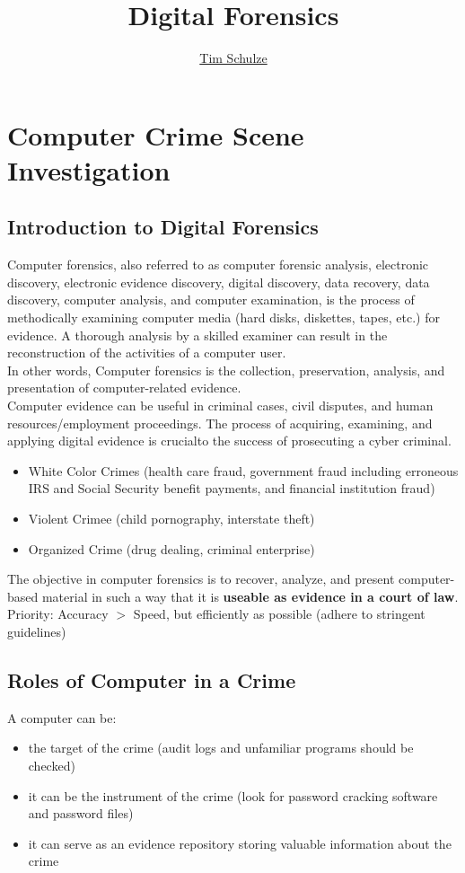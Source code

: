 \documentclass{scrreprt}
\title{\textbf{Digital Forensics}}
\author{\href{https://www.instagram.com/timds21/}{\color{black}Tim Schulze}}
\date{}
\begin{document}
\maketitle
\pagebreak
\renewcommand{\contentsname}{Inhaltsverzeichnis}
\setcounter{tocdepth}{1}
\tableofcontents
{}
\pagebreak
{}
\chapter{Computer Crime Scene Investigation}
\section{Introduction to Digital Forensics}
Computer forensics, also referred to as computer forensic analysis, electronic discovery, electronic evidence discovery, digital discovery, data recovery, data discovery, computer analysis, and computer examination, is the process of methodically examining computer media (hard disks, diskettes, tapes, etc.) for evidence. A thorough analysis by a skilled examiner can result in the reconstruction of the activities of a computer user.
\\In other words, Computer forensics is the collection, preservation, analysis, and presentation of computer-related evidence. 
\\Computer evidence can be useful in criminal cases, civil disputes, and human resources/employment proceedings.
The process of acquiring, examining, and applying digital evidence is crucialto the success of prosecuting a cyber criminal.
\begin{itemize}
\item White Color Crimes (health care fraud, government fraud including erroneous IRS and Social Security benefit payments, and financial institution fraud)
\item Violent Crimee (child pornography, interstate theft)
\item Organized Crime (drug dealing, criminal enterprise)
\end{itemize}
The objective in computer forensics is to recover, analyze, and present computer-based material in such a way that it is \textbf{useable as evidence in a court of law}. 
\\Priority: Accuracy $>$ Speed, but efficiently as possible (adhere to stringent guidelines)
\section{Roles of Computer in a Crime}
A computer can be:
\begin{itemize}
\item the target of the crime (audit logs and unfamiliar programs should be checked)
\item it can be the instrument of the crime (look for password cracking software and password files)
\item it can serve as an evidence repository storing valuable information about the crime
\end{itemize}
\end{document}

